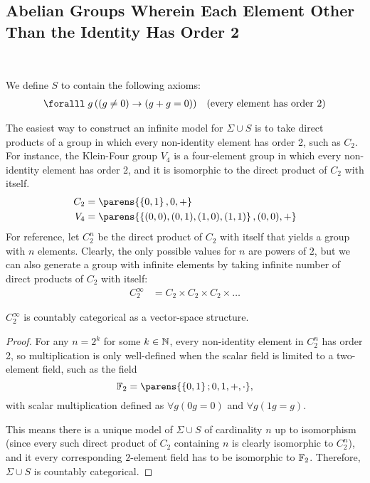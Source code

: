 \subsection{Abelian Groups Wherein Each Element Other Than the Identity
Has Order 2}~\label{sec:axiomatizing-abelian-groups-order-two}

We define $S$ to contain the following axioms:
\begin{align}
  \forall g\, ( (g \neq 0) \lto (g + g &= 0) ) &\text{(every element has order 2)}
\end{align}

\bigskip
The easiest way to construct an infinite model for $\Sigma \cup S$ is to take
direct products of a group in which every non-identity element has order 2,
such as $C_2$.
For instance, the Klein-Four group $V_4$ is a four-element group
in which every non-identity element has order 2,
and it is isomorphic to the direct product of $C_2$ with itself.
\begin{align*}
  C_2 &= \parens{ \set{0, 1}, 0, + } \\
  V_4 &= \parens{ \set{(0, 0), (0, 1), (1, 0), (1, 1)}, (0, 0), + }
\end{align*}
For reference, let $C_2^{n}$ be the direct product of $C_2$ with itself
that yields a group with $n$ elements. Clearly, the only possible values
for $n$ are powers of $2$, but we can also generate a group with infinite
elements by taking infinite number of direct products of $C_2$ with itself:
\begin{align*}
  C_2^{\infty} &= C_2 \times C_2 \times C_2 \times \ldots
\end{align*}

\begin{claim}
  $C^{\infty}_2$ is countably categorical as a vector-space structure.

  \begin{proof}
    For any $n = 2^k$ for some $k \in \mathbb{N}$, every non-identity element in
    $C^{n}_2$ has order 2, so multiplication is only well-defined
    when the scalar field is limited to a two-element field, such as the field
    \[ \F_2 = \parens{\set{0, 1}; 0, 1, +, \cdot}, \]
    with scalar multiplication defined as $\forall g (0g = 0)$ and $\forall g (1g = g)$.

    This means there is a unique model of $\Sigma \cup S$ of cardinality $n$
    up to isomorphism (since every such direct product of $C_2$ containing $n$
    is clearly isomorphic to $C^{n}_2$), and it every corresponding $2$-element
    field has to be isomorphic to $\mathbb{F}_2$.
    Therefore, $\Sigma \cup S$ is countably categorical.

  \end{proof}
\end{claim}

